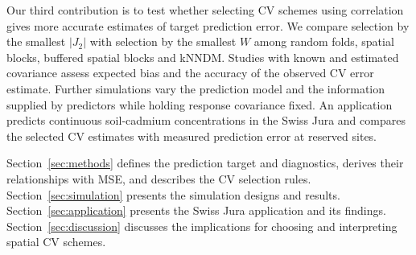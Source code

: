 Our third contribution is to test whether selecting CV schemes using correlation gives more accurate estimates of target prediction error. We compare selection by the smallest $|J_2|$ with selection by the smallest $W$ among random folds, spatial blocks, buffered spatial blocks and kNNDM. Studies with known and estimated covariance assess expected bias and the accuracy of the observed CV error estimate. Further simulations vary the prediction model and the information supplied by predictors while holding response covariance fixed. An application predicts continuous soil-cadmium concentrations in the Swiss Jura and compares the selected CV estimates with measured prediction error at reserved sites.

Section~\ref{sec:methods} defines the prediction target and diagnostics, derives their relationships with MSE, and describes the CV selection rules. Section~\ref{sec:simulation} presents the simulation designs and results. Section~\ref{sec:application} presents the Swiss Jura application and its findings. Section~\ref{sec:discussion} discusses the implications for choosing and interpreting spatial CV schemes.
